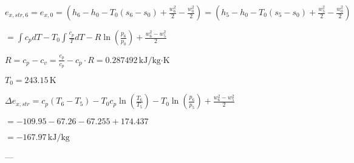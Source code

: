 \( e_{x,str,6} = e_{x,0} = (h_6 - h_0 - T_0 (s_6 - s_0) + \frac{w_6^2}{2} - \frac{w_0^2}{2}) = (h_5 - h_0 - T_0 (s_5 - s_0) + \frac{w_5^2}{2} - \frac{w_0^2}{2}) \)  

\( = \int c_p dT - T_0 \int \frac{c_p}{T} dT - R \ln \left( \frac{p_6}{p_0} \right) + \frac{w_6^2 - w_5^2}{2} \)  

\( R = c_p - c_v = \frac{c_p}{c_p} - c_p \cdot R = 0.287492 \, \text{kJ/kg·K} \)  

\( T_0 = 243.15 \, \text{K} \)  

\( \Delta e_{x,str} = c_p (T_6 - T_5) - T_0 c_p \ln \left( \frac{T_6}{T_5} \right) - T_0 \ln \left( \frac{p_6}{p_5} \right) + \frac{w_6^2 - w_5^2}{2} \)  

\( = -109.95 - 67.26 - 67.255 + 174.437 \)  

\( = -167.97 \, \text{kJ/kg} \)  

---